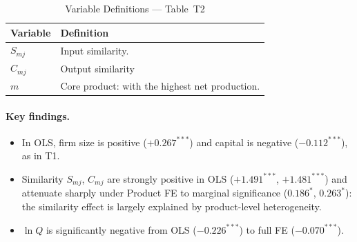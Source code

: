 \documentclass[12pt]{article}
\begin{document}
\begin{table}[H]
  \centering
  \caption{Variable Definitions --- Table~T2 }
  \label{tab:vardef_t2}
  \begin{tabular}{L{3.5cm} L{10.5cm}}
    \toprule
    Variable & Definition \\
    \midrule
    \(S_{mj}\) &
      Input similarity. \\[4pt]
    \(C_{mj}\) &
      Output similarity \\[4pt]
    \(m\) &
      Core product: with the highest net production. \\
    \bottomrule
  \end{tabular}
\end{table}

\paragraph{Key findings.}
\begin{itemize}[leftmargin=1.5em,nosep]
  \item In OLS, firm size is positive (\(+0.267^{***}\)) and capital is negative
    (\(-0.112^{***}\)), as in T1.
  \item Similarity \(S_{mj}\), \(C_{mj}\) are strongly positive in OLS
    (\(+1.491^{***}\), \(+1.481^{***}\)) and attenuate sharply under Product FE
    to marginal significance (\(0.186^{*}\), \(0.263^{*}\)): the similarity
    effect is largely explained by product-level heterogeneity.
  \item \(\ln Q\) is significantly negative from OLS (\(-0.226^{***}\)) to full
    FE (\(-0.070^{***}\)).
\end{itemize}
\end{document}
